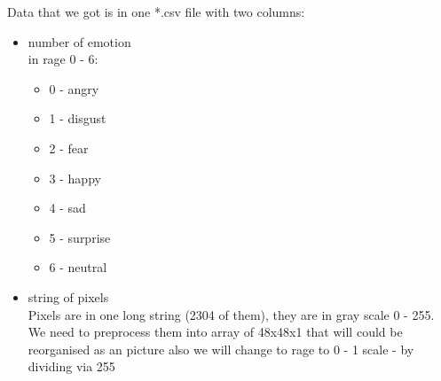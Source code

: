    Data that we got is in one *.csv file with two columns:
    \begin{itemize}
      \item number of emotion \\
        in rage 0 - 6:
        \begin{itemize}
            \item 0 - angry
            \item 1 - disgust
            \item 2 - fear
            \item 3 - happy
            \item 4 - sad
            \item 5 - surprise
            \item 6 - neutral
        \end{itemize}
      \item string of pixels \\
        Pixels are in one long string (2304 of them), they are in gray scale 0 - 255.\\
        We need to preprocess them into array of 48x48x1 that will could be reorganised as an picture also we will change to rage to 0 - 1 scale - by dividing via 255
        

    \end{itemize}
